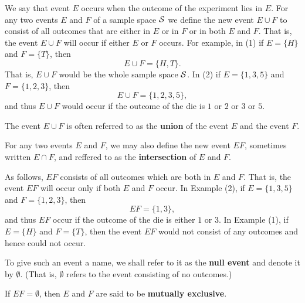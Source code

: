 We say that event $E$ occurs when the outcome of the experiment lies in $E$. For any two events $E$ and $F$ of a sample space $\mathcal{S}$ we define the new event $E \cup F$ to consist of all outcomes that are either in $E$ or in $F$ or in both $E$ and $F$. That is, the event $E \cup F$ will occur if either $E$ or $F$ occurs. For example, in (1) if $E = \{H\}$ and $F = \{T\}$, then 
\begin{equation*}
    E \cup F = \{H,T\}.
\end{equation*}
That is, $E \cup F$ would be the whole sample space $\mathcal{S}$. In (2) if $E = \{1, 3, 5\}$ and $F = \{1,2,3\}$, then 
\begin{equation*}
    E \cup F = \{1,2,3,5\},
\end{equation*}
and thus $E \cup F$ would occur if the outcome of the die is $1$ or $2$ or $3$ or $5$.


\begin{definition}[Unions]
    The event $E \cup F$ is often referred to as the \textbf{union} of the event $E$ and the event $F$.
\end{definition}

\begin{definition}[Intersections]
    For any two events $E$ and $F$, we may also define the new event $EF$, sometimes written $E \cap F$, and reffered to as the \textbf{intersection} of $E$ and $F$.
\end{definition}

As follows, $EF$ consists of all outcomes which are both in $E$ and $F$. That is, the event $EF$ will occur only if both $E$ and $F$ occur. In Example (2), if $E = \{1,3,5\}$ and $F = \{1,2,3\}$, then
\begin{equation*}
    EF = \{1,3\},
\end{equation*}
and thus $EF$ occur if the outcome of the die is either $1$ or $3$. In Example (1), if $E = \{H\}$ and $F = \{T\}$, then the event $EF$ would not consist of any outcomes and hence could not occur.

\begin{definition}
    To give such an event a name, we shall refer to it as the \textbf{null event} and denote it by $\emptyset$. (That is, $\emptyset$ refers to the event consisting of no outcomes.) 
\end{definition}

\begin{definition}
    If $EF = \emptyset$, then $E$ and $F$ are said to be \textbf{mutually exclusive}.
\end{definition}

